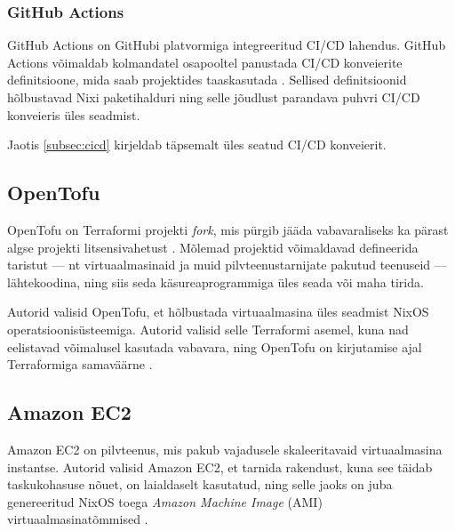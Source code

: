 \subsubsection{GitHub Actions}\label{subsubsec:github-actions}

GitHub Actions on GitHubi platvormiga integreeritud CI/CD lahendus. GitHub Actions võimaldab kolmandatel osapooltel panustada CI/CD konveierite definitsioone, mida saab projektides taaskasutada \cite{github-finding-actions}. Sellised definitsioonid hõlbustavad Nixi paketihalduri ning selle jõudlust parandava puhvri CI/CD konveieris üles seadmist.

Jaotis \ref{subsec:cicd} kirjeldab täpsemalt üles seatud CI/CD konveierit.

\subsection{OpenTofu}\label{subsec:opentofu}

OpenTofu on Terraformi projekti \emph{fork}, mis pürgib jääda vabavaraliseks ka pärast algse projekti litsensivahetust \cite{opentofu-faq-why}. Mõlemad projektid võimaldavad defineerida taristut — nt virtuaalmasinaid ja muid pilvteenustarnijate pakutud teenuseid — lähtekoodina, ning siis seda käsureaprogrammiga üles seada või maha tirida.

Autorid valisid OpenTofu, et hõlbustada virtuaalmasina üles seadmist NixOS operatsioonisüsteemiga. Autorid valisid selle Terraformi asemel, kuna nad eelistavad võimalusel kasutada vabavara, ning OpenTofu on kirjutamise ajal Terraformiga samaväärne \cite{opentofu-faq-terraform-replacement, opentofu-faq-state-file, opentofu-faq-providers}.

\subsection{Amazon EC2}\label{subsec:ec2}

Amazon EC2 on pilvteenus, mis pakub vajadusele skaleeritavaid virtuaalmasina instantse. Autorid valisid Amazon EC2, et tarnida rakendust, kuna see täidab taskukohasuse nõuet, on laialdaselt kasutatud, ning selle jaoks on juba genereeritud NixOS toega \emph{Amazon Machine Image} (AMI) virtuaalmasinatõmmised \cite{nixos-amis}.

